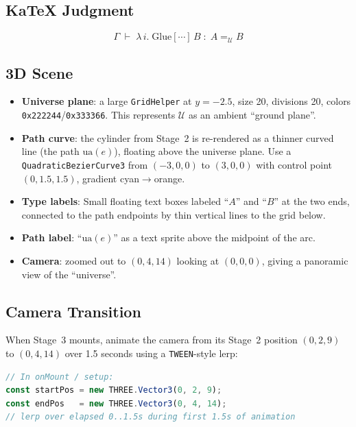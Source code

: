 \documentclass[11pt,a4paper]{article}
\begin{document}
\subsection{KaTeX Judgment}

\[
  \Gamma \;\vdash\; \lambda\,i.\;\mathrm{Glue}[\cdots]\,B \;:\; A =_{\mathcal{U}} B
\]

\subsection{3D Scene}

\begin{itemize}
  \item \textbf{Universe plane}: a large \texttt{GridHelper} at $y = -2.5$,
    size 20, divisions 20, colors \texttt{0x222244}/\texttt{0x333366}.  This
    represents $\mathcal{U}$ as an ambient ``ground plane''.
  \item \textbf{Path curve}: the cylinder from Stage~2 is re-rendered as a
    thinner curved line (the path $\mathrm{ua}(e)$), floating above the
    universe plane.  Use a \texttt{QuadraticBezierCurve3} from $(-3, 0, 0)$ to
    $(3, 0, 0)$ with control point $(0, 1.5, 1.5)$, gradient
    \textcolor{colorInterval}{cyan}$\to$\textcolor{colorResult}{orange}.
  \item \textbf{Type labels}: Small floating text boxes labeled ``$A$'' and
    ``$B$'' at the two ends, connected to the path endpoints by thin vertical
    lines to the grid below.
  \item \textbf{Path label}: ``$\mathrm{ua}(e)$'' as a text sprite above the
    midpoint of the arc.
  \item \textbf{Camera}: zoomed out to $(0, 4, 14)$ looking at $(0, 0, 0)$,
    giving a panoramic view of the ``universe''.
\end{itemize}

\subsection{Camera Transition}

When Stage~3 mounts, animate the camera from its Stage~2 position
$(0, 2, 9)$ to $(0, 4, 14)$ over 1.5 seconds using a \texttt{TWEEN}-style
lerp:
\begin{lstlisting}[language=javascript]
// In onMount / setup:
const startPos = new THREE.Vector3(0, 2, 9);
const endPos   = new THREE.Vector3(0, 4, 14);
// lerp over elapsed 0..1.5s during first 1.5s of animation
\end{lstlisting}
\end{document}
